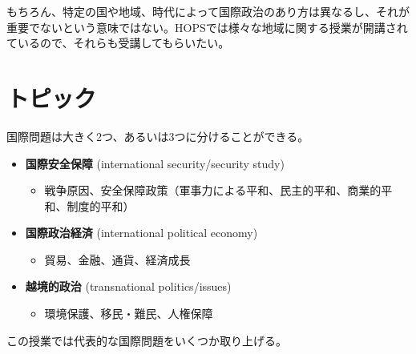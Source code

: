 \documentclass[
  xelatex,
  ja=standard]{bxjsarticle}
\providecommand{\tightlist}{%
  \setlength{\itemsep}{0pt}\setlength{\parskip}{0pt}}\usepackage{longtable,booktabs,array}
\begin{document}
\begin{tcolorbox}[enhanced jigsaw, titlerule=0mm, colback=white, breakable, opacityback=0, rightrule=.15mm, coltitle=black, title=\textcolor{quarto-callout-warning-color}{\faExclamationTriangle}\hspace{0.5em}{地域研究や歴史研究}, bottomtitle=1mm, left=2mm, colbacktitle=quarto-callout-warning-color!10!white, toptitle=1mm, opacitybacktitle=0.6, colframe=quarto-callout-warning-color-frame, arc=.35mm, bottomrule=.15mm, leftrule=.75mm, toprule=.15mm]

もちろん、特定の国や地域、時代によって国際政治のあり方は異なるし、それが重要でないという意味ではない。HOPSでは様々な地域に関する授業が開講されているので、それらも受講してもらいたい。

\end{tcolorbox}

\hypertarget{ux30c8ux30d4ux30c3ux30af}{%
\section{トピック}\label{ux30c8ux30d4ux30c3ux30af}}

国際問題は大きく2つ、あるいは3つに分けることができる。

\begin{itemize}
\tightlist
\item
  \textbf{国際安全保障} (international security/security study)

  \begin{itemize}
  \tightlist
  \item
    戦争原因、安全保障政策（軍事力による平和、民主的平和、商業的平和、制度的平和）
  \end{itemize}
\item
  \textbf{国際政治経済} (international political economy)

  \begin{itemize}
  \tightlist
  \item
    貿易、金融、通貨、経済成長
  \end{itemize}
\item
  \textbf{越境的政治} (transnational politics/issues)

  \begin{itemize}
  \tightlist
  \item
    環境保護、移民・難民、人権保障
  \end{itemize}
\end{itemize}

この授業では代表的な国際問題をいくつか取り上げる。
\end{document}
